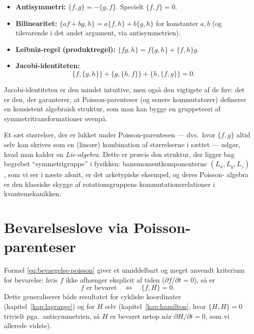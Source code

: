 \begin{itemize}
  \item \textbf{Antisymmetri:} $\{f,g\} = -\{g,f\}$. Specielt
        $\{f,f\}=0$.
  \item \textbf{Bilinearitet:} $\{af+bg,h\} = a\{f,h\}+b\{g,h\}$ for
        konstanter $a,b$ (og tilsvarende i det andet argument, via
        antisymmetrien).
  \item \textbf{Leibniz-regel (produktregel):}
        $\{fg,h\} = f\{g,h\} + \{f,h\}g$.
  \item \textbf{Jacobi-identiteten:}
        \begin{equation}
          \{f,\{g,h\}\} + \{g,\{h,f\}\} + \{h,\{f,g\}\} = 0.
        \end{equation}
\end{itemize}

Jacobi-identiteten er den mindst intuitive, men også den vigtigste af
de fire: det er den, der garanterer, at Poisson-parenteser (og senere
kommutatorer) definerer en konsistent algebraisk struktur, som man kan
bygge en gruppeteori af symmetritransformationer ovenpå.

\begin{bemaerkning}
Et sæt størrelser, der er lukket under Poisson-parentesen — dvs.\
hvor $\{f,g\}$ altid selv kan skrives som en (lineær) kombination af
størrelserne i sættet — udgør, hvad man kalder en \emph{Lie-algebra}.
Dette er præcis den struktur, der ligger bag begrebet ``symmetrigruppe''
i fysikken: banemomentkomponenterne $(L_x,L_y,L_z)$, som vi ser i
næste afsnit, er det arketypiske eksempel, og deres Poisson-
algebra er den klassiske skygge af rotationsgruppens
kommutationsrelationer i kvantemekanikken.
\end{bemaerkning}

\section{Bevarelseslove via Poisson-parenteser}

Formel \eqref{eq:bevaegelse-poisson} giver et umiddelbart og meget
anvendt kriterium for bevarelse: hvis $f$ ikke afhænger eksplicit af
tiden ($\partial f/\partial t=0$), så er
\begin{equation}
  \boxed{f \text{ er bevaret} \quad\Longleftrightarrow\quad \{f,H\}=0.}
  \label{eq:bevarelse-poisson}
\end{equation}
Dette generaliserer både resultatet for cykliske koordinater
(kapitel~\ref{kap:lagrange}) og for $H$ selv
(kapitel~\ref{kap:hamilton}, hvor $\{H,H\}=0$ trivielt pga.\
antisymmetrien, så $H$ er bevaret netop når $\partial H/\partial t=0$,
som vi allerede vidste).

